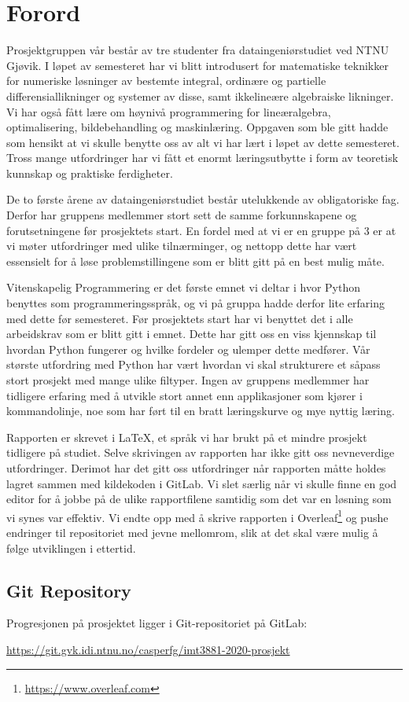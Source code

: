 \section*{Forord}
Prosjektgruppen vår består av tre studenter fra dataingeniørstudiet ved NTNU Gjøvik. I løpet av 
semesteret har vi blitt introdusert for matematiske teknikker for numeriske løsninger av bestemte 
integral, ordinære og partielle differensiallikninger og systemer av disse, samt ikkelineære algebraiske likninger. Vi har også fått lære om høynivå programmering for lineæralgebra, optimalisering, bildebehandling og maskinlæring. Oppgaven som ble gitt hadde som hensikt at vi skulle benytte oss av alt vi har lært i løpet av dette semesteret. Tross mange utfordringer har vi fått et enormt læringsutbytte i form av teoretisk kunnskap og praktiske ferdigheter.

De to første årene av dataingeniørstudiet består utelukkende av obligatoriske fag. Derfor har gruppens medlemmer stort sett de samme forkunnskapene og forutsetningene før prosjektets start. En fordel med at vi er en gruppe på 3 er at vi møter utfordringer med ulike tilnærminger, og nettopp dette har vært essensielt for å løse problemstillingene som er blitt gitt på en best mulig måte.

Vitenskapelig Programmering er det første emnet vi deltar i hvor Python benyttes som programmeringsspråk, og vi på gruppa hadde derfor lite erfaring med dette før semesteret. Før prosjektets start har vi benyttet det i alle arbeidskrav som er blitt gitt i emnet. Dette har gitt oss en viss kjennskap til hvordan Python fungerer og hvilke fordeler og ulemper dette medfører. Vår største utfordring med Python har vært hvordan vi skal strukturere et såpass stort prosjekt med mange ulike filtyper. Ingen av gruppens medlemmer har tidligere erfaring med å utvikle stort annet enn applikasjoner som kjører i kommandolinje, noe som har ført til en bratt læringskurve og mye nyttig læring.

Rapporten er skrevet i \LaTeX, et språk vi har brukt på et mindre prosjekt tidligere på studiet. Selve skrivingen av rapporten har ikke gitt oss nevneverdige utfordringer. Derimot har det gitt oss utfordringer når rapporten måtte holdes lagret sammen med kildekoden i GitLab. Vi slet særlig når vi skulle finne en god editor for å jobbe på de ulike rapportfilene samtidig som det var en løsning som vi synes var effektiv. Vi endte opp med å skrive rapporten i Overleaf\footnote{\url{https://www.overleaf.com}} og pushe endringer til repositoriet med jevne mellomrom, slik at det skal være mulig å følge utviklingen i ettertid.

\subsection*{Git Repository}
Progresjonen på prosjektet ligger i Git-repositoriet på GitLab:

\url{https://git.gvk.idi.ntnu.no/casperfg/imt3881-2020-prosjekt}